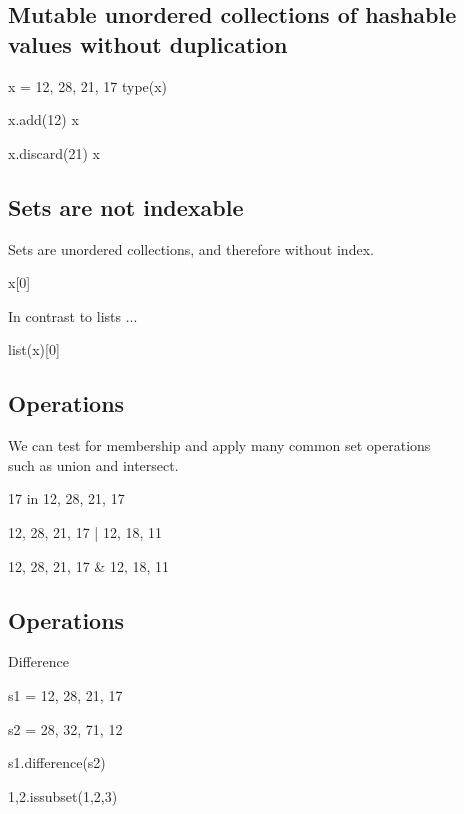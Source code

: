 \documentclass[aspectratio=1610,slidestop]{beamer}
\begin{document}
\subsection{Mutable unordered collections of hashable values without duplication}
\begin{pframe}
\begin{pyconsole}
x = {12, 28, 21, 17}
type(x)

x.add(12)
x

x.discard(21)
x
\end{pyconsole}
\end{pframe}

\subsection{Sets are not indexable}
\begin{pframe}
Sets are unordered collections, and therefore without index.
\begin{pyconsole}
x[0]
\end{pyconsole}
\medskip
\medskip

In contrast to lists ...
\begin{pyconsole}
list(x)[0]
\end{pyconsole}
\end{pframe}


\subsection{Operations}
\begin{pframe}
We can test for membership and apply many common set operations\\
such as union and intersect.
\medskip

\begin{pyconsole}
17 in {12, 28, 21, 17}

{12, 28, 21, 17} | {12, 18, 11}

{12, 28, 21, 17} & {12, 18, 11}
\end{pyconsole}
\end{pframe}


\subsection{Operations}
\begin{pframe}
 Difference
 \medskip

\begin{pyconsole}
s1 = {12, 28, 21, 17}

s2 = {28, 32, 71, 12}

s1.difference(s2)

{1,2}.issubset({1,2,3})
\end{pyconsole}
\end{pframe}
\end{document}
